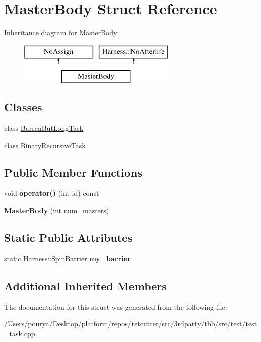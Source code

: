 \hypertarget{structMasterBody}{}\section{Master\+Body Struct Reference}
\label{structMasterBody}
Inheritance diagram for Master\+Body\+:\begin{figure}[H]
\begin{center}
\leavevmode
\includegraphics[height=2.000000cm]{structMasterBody}
\end{center}
\end{figure}
\subsection*{Classes}
\begin{DoxyCompactItemize}
\item 
class \hyperlink{classMasterBody_1_1BarrenButLongTask}{Barren\+But\+Long\+Task}
\item 
class \hyperlink{classMasterBody_1_1BinaryRecursiveTask}{Binary\+Recursive\+Task}
\end{DoxyCompactItemize}
\subsection*{Public Member Functions}
\begin{DoxyCompactItemize}
\item 
\hypertarget{structMasterBody_a242bf1bcea81587923eb48e9d3c8b523}{}void {\bfseries operator()} (int id) const \label{structMasterBody_a242bf1bcea81587923eb48e9d3c8b523}

\item 
\hypertarget{structMasterBody_ae997d380407931d55108f4b91a82f503}{}{\bfseries Master\+Body} (int num\+\_\+masters)\label{structMasterBody_ae997d380407931d55108f4b91a82f503}

\end{DoxyCompactItemize}
\subsection*{Static Public Attributes}
\begin{DoxyCompactItemize}
\item 
\hypertarget{structMasterBody_af489b23a4bd65964f1613e5fd8739be0}{}static \hyperlink{classHarness_1_1SpinBarrier}{Harness\+::\+Spin\+Barrier} {\bfseries my\+\_\+barrier}\label{structMasterBody_af489b23a4bd65964f1613e5fd8739be0}

\end{DoxyCompactItemize}
\subsection*{Additional Inherited Members}


The documentation for this struct was generated from the following file\+:\begin{DoxyCompactItemize}
\item 
/\+Users/pourya/\+Desktop/platform/repos/tetcutter/src/3rdparty/tbb/src/test/test\+\_\+task.\+cpp\end{DoxyCompactItemize}
